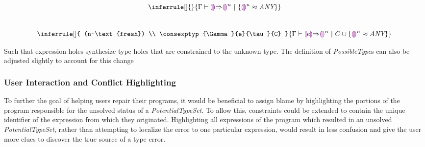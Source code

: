 \begin{equation}
    \inferrule[]{ }{
        \consexptyp{\Gamma}{\llparenthesiscolor \rrparenthesiscolor}{\llparenthesiscolor \rrparenthesiscolor^n}{\{ \tehole^n \approx \emph{ANY} \}}
      }
\end{equation}
\\
\begin{equation}
    \inferrule[]{
        (n~\text{fresh}) \\
        \consexptyp{\Gamma}{e}{\tau}{C}
       }{
         \consexptyp{\Gamma}{\llparenthesiscolor e \rrparenthesiscolor}{\llparenthesiscolor \rrparenthesiscolor^n}{C \cup \{ \tehole^n \approx \emph{ANY} \}}
       }
\end{equation}

Such that expression holes synthesize type holes that are constrained to the unknown type. The definition of \emph{PossibleType}s can also be adjusted slightly to account for this change


\subsubsection{User Interaction and Conflict Highlighting}
To further the goal of helping users repair their programs, it would be beneficial to assign blame by highlighting the portions of the program responsible for the unsolved status of a \textit{PotentialTypeSet}. To allow this, constraints could be extended to contain the unique identifier of the expression from which they originated. Highlighting all expressions of the program which resulted in an unsolved \textit{PotentialTypeSet}, rather than attempting to localize the error to one particular expression, would result in less confusion and give the user more clues to discover the true source of a type error.



